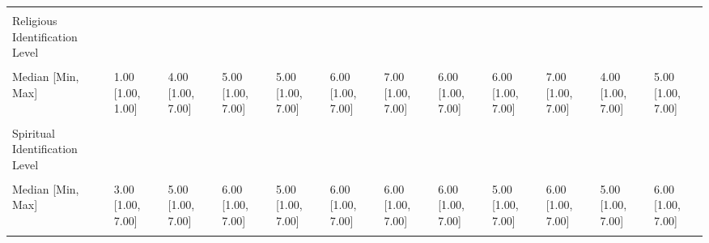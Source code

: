 \documentclass[
  single column]{article}
\begin{document}
\begin{landscape}
\begin{longtable}[t]{llllllllllll}
\endfoot
\bottomrule
\endlastfoot
\cellcolor{gray!10}{} & \cellcolor{gray!10}{(N=21551)} & \cellcolor{gray!10}{(N=1363)} & \cellcolor{gray!10}{(N=270)} & \cellcolor{gray!10}{(N=2017)} & \cellcolor{gray!10}{(N=3696)} & \cellcolor{gray!10}{(N=1095)} & \cellcolor{gray!10}{(N=136)} & \cellcolor{gray!10}{(N=87)} & \cellcolor{gray!10}{(N=658)} & \cellcolor{gray!10}{(N=576)} & \cellcolor{gray!10}{(N=744)}\\
Religious Identification Level &  &  &  &  &  &  &  &  &  &  & \\
\cellcolor{gray!10}{Mean (SD)} & \cellcolor{gray!10}{1.00 (0)} & \cellcolor{gray!10}{3.98 (1.99)} & \cellcolor{gray!10}{5.02 (1.65)} & \cellcolor{gray!10}{4.51 (1.86)} & \cellcolor{gray!10}{5.60 (1.72)} & \cellcolor{gray!10}{5.75 (1.66)} & \cellcolor{gray!10}{5.42 (1.64)} & \cellcolor{gray!10}{5.23 (1.72)} & \cellcolor{gray!10}{6.45 (1.14)} & \cellcolor{gray!10}{4.17 (1.95)} & \cellcolor{gray!10}{5.13 (1.84)}\\
Median [Min, Max] & 1.00 [1.00, 1.00] & 4.00 [1.00, 7.00] & 5.00 [1.00, 7.00] & 5.00 [1.00, 7.00] & 6.00 [1.00, 7.00] & 7.00 [1.00, 7.00] & 6.00 [1.00, 7.00] & 6.00 [1.00, 7.00] & 7.00 [1.00, 7.00] & 4.00 [1.00, 7.00] & 5.00 [1.00, 7.00]\\
\cellcolor{gray!10}{Missing} & \cellcolor{gray!10}{0 (0\%)} & \cellcolor{gray!10}{78 (5.7\%)} & \cellcolor{gray!10}{20 (7.4\%)} & \cellcolor{gray!10}{105 (5.2\%)} & \cellcolor{gray!10}{176 (4.8\%)} & \cellcolor{gray!10}{59 (5.4\%)} & \cellcolor{gray!10}{11 (8.1\%)} & \cellcolor{gray!10}{3 (3.4\%)} & \cellcolor{gray!10}{73 (11.1\%)} & \cellcolor{gray!10}{43 (7.5\%)} & \cellcolor{gray!10}{74 (9.9\%)}\\
\addlinespace
Spiritual Identification Level &  &  &  &  &  &  &  &  &  &  & \\
\cellcolor{gray!10}{Mean (SD)} & \cellcolor{gray!10}{3.11 (1.92)} & \cellcolor{gray!10}{4.66 (1.78)} & \cellcolor{gray!10}{5.71 (1.37)} & \cellcolor{gray!10}{4.95 (1.68)} & \cellcolor{gray!10}{5.75 (1.46)} & \cellcolor{gray!10}{5.76 (1.49)} & \cellcolor{gray!10}{5.48 (1.60)} & \cellcolor{gray!10}{4.54 (2.01)} & \cellcolor{gray!10}{5.27 (1.76)} & \cellcolor{gray!10}{4.61 (1.77)} & \cellcolor{gray!10}{5.79 (1.53)}\\
Median [Min, Max] & 3.00 [1.00, 7.00] & 5.00 [1.00, 7.00] & 6.00 [1.00, 7.00] & 5.00 [1.00, 7.00] & 6.00 [1.00, 7.00] & 6.00 [1.00, 7.00] & 6.00 [1.00, 7.00] & 5.00 [1.00, 7.00] & 6.00 [1.00, 7.00] & 5.00 [1.00, 7.00] & 6.00 [1.00, 7.00]\\
\cellcolor{gray!10}{Missing} & \cellcolor{gray!10}{1327 (6.2\%)} & \cellcolor{gray!10}{119 (8.7\%)} & \cellcolor{gray!10}{28 (10.4\%)} & \cellcolor{gray!10}{191 (9.5\%)} & \cellcolor{gray!10}{330 (8.9\%)} & \cellcolor{gray!10}{96 (8.8\%)} & \cellcolor{gray!10}{14 (10.3\%)} & \cellcolor{gray!10}{11 (12.6\%)} & \cellcolor{gray!10}{20 (3.0\%)} & \cellcolor{gray!10}{54 (9.4\%)} & \cellcolor{gray!10}{78 (10.5\%)}\\

\end{longtable}
\end{landscape}
\end{document}
